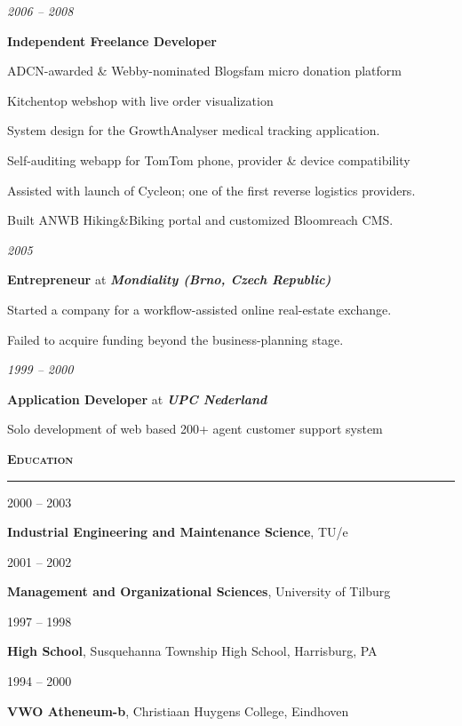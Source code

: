 \documentclass[a4paper,11pt]{article}
\newlength{\sectionindent}
\newlength{\marginwidth}
\newlength{\sectionheaderindent}
\newcommand{\sectionheader}[1]{
    \vspace{1mm}
    \begin{minipage}[t]{\textwidth}
        \hspace{\sectionheaderindent}\textbf{\textsc{#1}}\\[-8pt\baselineskip] 
        \rule{\textwidth}{1pt}
    \end{minipage}\strut\vspace{3mm}}
\newcommand{\margin}[1]{
    \begin{minipage}[t]{\dimexpr\sectionindent-\marginwidth}
        \begin{flushright}
            \textit{#1}
        \end{flushright}
    \end{minipage}
    \hspace{\marginwidth}}
\newenvironment{descriptionsection}{
    \begingroup
    \setlength{\parskip}{4pt plus 2pt minus 1pt} 
}{
    \endgroup
}
\newcommand{\jobentry}[4]{
    \margin{#1}
    \begin{minipage}[t]{\dimexpr\textwidth-\sectionindent}
        \textbf{#2} at \textit{\textbf{#3}}\\[1pt]
        \begin{descriptionsection}
        #4
        \end{descriptionsection}
    \end{minipage}\vspace{4pt}}
\newcommand{\itemizedjobentry}[3]{
  \margin{#1}
  \begin{minipage}[t]{\dimexpr\textwidth-\sectionindent}
    \textbf{#2}
    \vspace{1pt}
    \begin{customitemize}
      #3
    \end{customitemize}
    \vspace{1pt}
  \end{minipage}}
\newcommand{\educationentry}[4]{
    \noindent
    \begin{minipage}[t]{\sectionindent}
        #1 -- #2
    \end{minipage}
    \begin{minipage}[t]{\dimexpr\textwidth-\sectionindent}
        \textbf{#3}, #4
    \end{minipage}
    \par}
\begin{document}
\itemizedjobentry{2006 -- 2008}{Independent Freelance Developer}{
    \item ADCN-awarded \& Webby-nominated Blogsfam micro donation platform
    \item Kitchentop webshop with live order visualization
    \item System design for the GrowthAnalyser medical tracking application.
    \item Self-auditing webapp for TomTom phone, provider \& device compatibility
    \item Assisted with launch of Cycleon; one of the first reverse logistics providers.
    \item Built ANWB Hiking\&Biking portal and customized Bloomreach CMS.
}

\jobentry{2005}{Entrepreneur}{Mondiality (Brno, Czech Republic)}{
Started a company for a workflow-assisted online real-estate exchange.

Failed to acquire funding beyond the business-planning stage.}

\jobentry{1999 -- 2000}{Application Developer}{UPC Nederland}{Solo development of web based 200+ agent customer support system}

\sectionheader{Education}
\educationentry{2000}{2003}{Industrial Engineering and Maintenance Science}{TU/e}
\educationentry{2001}{2002}{Management and Organizational Sciences}{University of Tilburg}
\educationentry{1997}{1998}{High School}{Susquehanna Township High School, Harrisburg, PA}
\educationentry{1994}{2000}{VWO Atheneum-b}{Christiaan Huygens College, Eindhoven}
\end{document}
